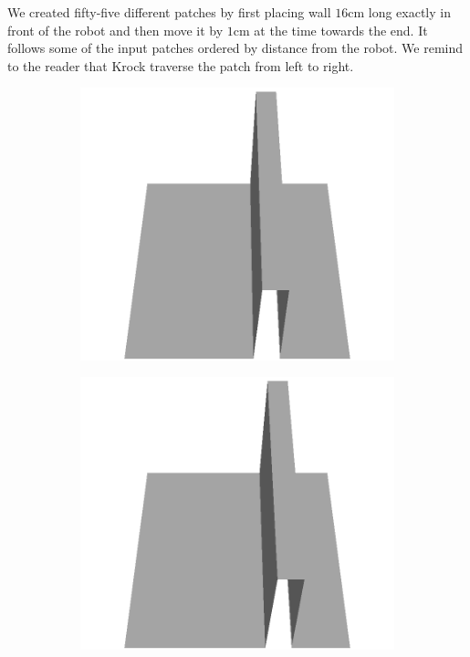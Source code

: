 We created fifty-five different patches by first placing wall $16$cm long exactly in front of the robot and then move it by $1$cm at the time towards the end. It follows some of the input patches ordered by distance from the robot. We remind to the reader that Krock traverse the patch from left to
 right.
\begin{figure}[H]
    \centering
    \begin{subfigure}[b]{0.24\textwidth}
    \includegraphics[width=\linewidth]{../img/5/custom_patches/walls_front/all/00-3d.png}
    \end{subfigure}
    \begin{subfigure}[b]{0.24\textwidth}
    \includegraphics[width=\linewidth]{../img/5/custom_patches/walls_front/all/04-3d.png}

\end{subfigure}
\end{figure}
